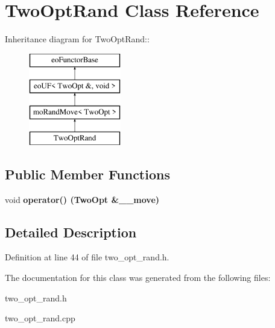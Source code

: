 \section{Two\-Opt\-Rand Class Reference}
\label{class_two_opt_rand}
Inheritance diagram for Two\-Opt\-Rand::\begin{figure}[H]
\begin{center}
\leavevmode
\includegraphics[height=4cm]{class_two_opt_rand}
\end{center}
\end{figure}
\subsection*{Public Member Functions}
\begin{CompactItemize}
\item 
void \bf{operator()} (\bf{Two\-Opt} \&\_\-\_\-move)\label{class_two_opt_rand_bcba673ec71e565f536674bfe5bab609}

\end{CompactItemize}


\subsection{Detailed Description}




Definition at line 44 of file two\_\-opt\_\-rand.h.

The documentation for this class was generated from the following files:\begin{CompactItemize}
\item 
two\_\-opt\_\-rand.h\item 
two\_\-opt\_\-rand.cpp\end{CompactItemize}
